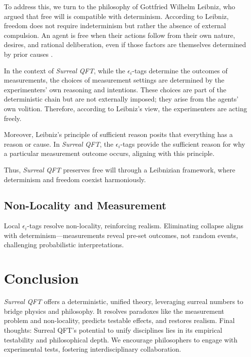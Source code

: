 \documentclass{article}
\begin{document}
To address this, we turn to the philosophy of Gottfried Wilhelm Leibniz, who argued that free will is compatible with determinism. According to Leibniz, freedom does not require indeterminism but rather the absence of external compulsion. An agent is free when their actions follow from their own nature, desires, and rational deliberation, even if those factors are themselves determined by prior causes \cite{Leibniz1686}.

In the context of \textit{Surreal QFT}, while the \(\epsilon_i\)-tags determine the outcomes of measurements, the choices of measurement settings are determined by the experimenters' own reasoning and intentions. These choices are part of the deterministic chain but are not externally imposed; they arise from the agents' own volition. Therefore, according to Leibniz's view, the experimenters are acting freely.

Moreover, Leibniz's principle of sufficient reason posits that everything has a reason or cause. In \textit{Surreal QFT}, the \(\epsilon_i\)-tags provide the sufficient reason for why a particular measurement outcome occurs, aligning with this principle.

Thus, \textit{Surreal QFT} preserves free will through a Leibnizian framework, where determinism and freedom coexist harmoniously.

\subsection{Non-Locality and Measurement}
Local \(\epsilon_i\)-tags resolve non-locality, reinforcing realism. Eliminating collapse aligns with determinism---measurements reveal pre-set outcomes, not random events, challenging probabilistic interpretations.

\section{Conclusion}
\textit{Surreal QFT} offers a deterministic, unified theory, leveraging surreal numbers to bridge physics and philosophy. It resolves paradoxes like the measurement problem and non-locality, predicts testable effects, and restores realism. Final thoughts: Surreal QFT's potential to unify disciplines lies in its empirical testability and philosophical depth. We encourage philosophers to engage with experimental tests, fostering interdisciplinary collaboration.
\end{document}
